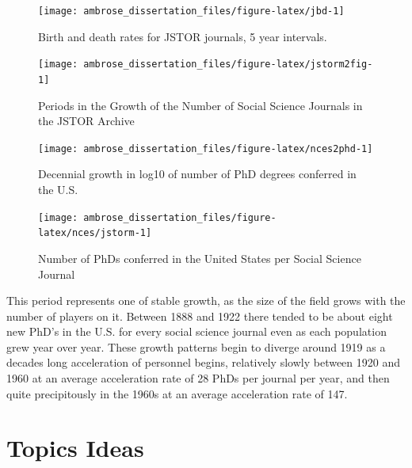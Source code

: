 \documentclass[]{book}
\theoremstyle{definition}
\theoremstyle{definition}
\theoremstyle{definition}
\theoremstyle{remark}
\begin{document}
\begin{figure}

{\centering \texttt{[image: ambrose\_dissertation\_files/figure-latex/jbd-1]} 

}

\caption{Birth and death rates for JSTOR journals, 5 year intervals.}\label{fig:jbd}
\end{figure}

\begin{figure}

{\centering \texttt{[image: ambrose\_dissertation\_files/figure-latex/jstorm2fig-1]} 

}

\caption{Periods in the Growth of the Number of Social Science Journals in the JSTOR Archive}\label{fig:jstorm2fig}
\end{figure}

\begin{figure}

{\centering \texttt{[image: ambrose\_dissertation\_files/figure-latex/nces2phd-1]} 

}

\caption{Decennial growth in log10 of number of PhD degrees conferred in the U.S.}\label{fig:nces2phd}
\end{figure}

\begin{figure}

{\centering \texttt{[image: ambrose\_dissertation\_files/figure-latex/nces/jstorm-1]} 

}

\caption{Number of PhDs conferred in the United States per Social Science Journal}\label{fig:nces/jstorm}
\end{figure}

This period represents one of stable growth, as the size of the field
grows with the number of players on it. Between 1888 and 1922 there
tended to be about eight new PhD's in the U.S. for every social science
journal even as each population grew year over year. These growth
patterns begin to diverge around 1919 as a decades long acceleration of
personnel begins, relatively slowly between 1920 and 1960 at an average
acceleration rate of 28 PhDs per journal per year, and then quite
precipitously in the 1960s at an average acceleration rate of 147.

\hypertarget{topics-ideas}{%
\section{\texorpdfstring{ Topics 
Ideas}{ Topics  Ideas}}\label{topics-ideas}}
\end{document}
